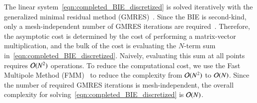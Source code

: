 \documentclass[preprint, 10pt]{elsarticle}
\begin{document}
The linear system~\eqref{eqn:completed_BIE_discretized} is solved
iteratively with the generalized minimal residual method
(GMRES)~\cite{saa-sch1986}.  Since the BIE is second-kind, only a
mesh-independent number of GMRES iterations are
required~\cite{cam-ips-kel-mey-xue1996}.  Therefore, the asymptotic cost
is determined by the cost of performing a matrix-vector multiplication,
and the bulk of the cost is evaluating the $N$-term sum
in~\eqref{eqn:completed_BIE_discretized}.  Naively, evaluating this sum
at all points requires ${\mathcal{O}}(N^2)$ operations.  To reduce the
computational cost, we use the Fast Multipole Method
(FMM)~\cite{gre-rok1987, gre-gre-may1992} to reduce the complexity from
${\mathcal{O}}(N^2)$ to ${\mathcal{O}}(N)$.  Since the number of required GMRES
iterations is mesh-independent, the overall complexity for
solving~\eqref{eqn:completed_BIE_discretized} is ${\mathcal{O}}(N)$.


\end{document}
